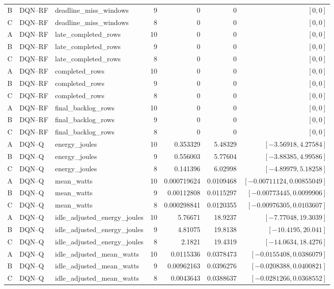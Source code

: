 \begin{longtable}{lllrrrr}
B & DQN--RF & deadline\_miss\_windows & 9 & 0 & 0 & $[0,0]$\\
C & DQN--RF & deadline\_miss\_windows & 8 & 0 & 0 & $[0,0]$\\
A & DQN--RF & late\_completed\_rows & 10 & 0 & 0 & $[0,0]$\\
B & DQN--RF & late\_completed\_rows & 9 & 0 & 0 & $[0,0]$\\
C & DQN--RF & late\_completed\_rows & 8 & 0 & 0 & $[0,0]$\\
A & DQN--RF & completed\_rows & 10 & 0 & 0 & $[0,0]$\\
B & DQN--RF & completed\_rows & 9 & 0 & 0 & $[0,0]$\\
C & DQN--RF & completed\_rows & 8 & 0 & 0 & $[0,0]$\\
A & DQN--RF & final\_backlog\_rows & 10 & 0 & 0 & $[0,0]$\\
B & DQN--RF & final\_backlog\_rows & 9 & 0 & 0 & $[0,0]$\\
C & DQN--RF & final\_backlog\_rows & 8 & 0 & 0 & $[0,0]$\\
A & DQN--Q & energy\_joules & 10 & 0.353329 & 5.48329 & $[-3.56918,4.27584]$\\
B & DQN--Q & energy\_joules & 9 & 0.556003 & 5.77604 & $[-3.88385,4.99586]$\\
C & DQN--Q & energy\_joules & 8 & 0.141396 & 6.02998 & $[-4.89979,5.18258]$\\
A & DQN--Q & mean\_watts & 10 & 0.000719624 & 0.0109468 & $[-0.00711124,0.00855049]$\\
B & DQN--Q & mean\_watts & 9 & 0.00112808 & 0.0115297 & $[-0.00773445,0.0099906]$\\
C & DQN--Q & mean\_watts & 8 & 0.000298841 & 0.0120355 & $[-0.00976305,0.0103607]$\\
A & DQN--Q & idle\_adjusted\_energy\_joules & 10 & 5.76671 & 18.9237 & $[-7.77048,19.3039]$\\
B & DQN--Q & idle\_adjusted\_energy\_joules & 9 & 4.81075 & 19.8138 & $[-10.4195,20.041]$\\
C & DQN--Q & idle\_adjusted\_energy\_joules & 8 & 2.1821 & 19.4319 & $[-14.0634,18.4276]$\\
A & DQN--Q & idle\_adjusted\_mean\_watts & 10 & 0.0115336 & 0.0378473 & $[-0.0155408,0.0386079]$\\
B & DQN--Q & idle\_adjusted\_mean\_watts & 9 & 0.00962163 & 0.0396276 & $[-0.0208388,0.0400821]$\\
C & DQN--Q & idle\_adjusted\_mean\_watts & 8 & 0.0043643 & 0.0388637 & $[-0.0281266,0.0368552]$\\

\end{longtable}
